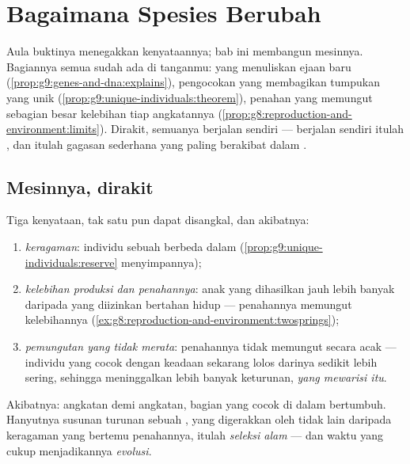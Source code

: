 \chapter{Bagaimana Spesies Berubah}\label{ch:g9:how-species-change}

Aula buktinya menegakkan kenyataannya; bab ini membangun
mesinnya. Bagiannya semua sudah ada di tanganmu:  yang
menuliskan ejaan baru
(\cref{prop:g9:genes-and-dna:explains}), pengocokan yang
membagikan tumpukan yang unik
(\cref{prop:g9:unique-individuals:theorem}), penahan
 yang memungut sebagian besar kelebihan tiap
angkatannya
(\cref{prop:g8:reproduction-and-environment:limits}).
Dirakit, semuanya berjalan sendiri --- berjalan sendiri
itulah , dan itulah gagasan sederhana yang
paling berakibat dalam .

\section{Mesinnya, dirakit}

\begin{proposition}\label{prop:g9:how-species-change:selection}
Tiga kenyataan, tak satu pun dapat disangkal, dan akibatnya:
\begin{enumerate}
  \item \emph{keragaman}: individu sebuah  berbeda
        dalam 
        (\cref{prop:g9:unique-individuals:reserve}
        menyimpannya);
  \item \emph{kelebihan produksi dan penahannya}: anak yang
        dihasilkan jauh lebih banyak daripada yang diizinkan
         bertahan hidup --- penahannya memungut
        kelebihannya (\cref{ex:g8:reproduction-and-environment:twosprings});
  \item \emph{pemungutan yang tidak merata}: penahannya
        tidak memungut secara acak --- individu yang  cocok dengan keadaan sekarang lolos
        darinya sedikit lebih sering, sehingga meninggalkan
        lebih banyak keturunan, \emph{yang mewarisi  itu}.
\end{enumerate}
Akibatnya: angkatan demi angkatan, bagian  yang cocok di
dalam  bertumbuh. Hanyutnya susunan turunan
sebuah , yang digerakkan oleh tidak lain daripada
keragaman yang bertemu penahannya, itulah \emph{seleksi
alam} --- dan waktu yang cukup
menjadikannya \emph{evolusi}.
\end{proposition}
\admitted

